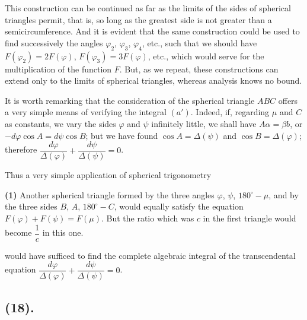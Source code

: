 \documentclass{article}
\begin{document}
This construction can be continued as far as the limits of the sides of spherical triangles permit, that is, so long as the greatest side is not greater than a semicircumference. And it is evident that the same construction could be used to find successively the angles $\varphi_{2}$, $\varphi_{3}$, $\varphi_{4}$, etc., such that we should have $F(\varphi_{2})=2F(\varphi)$, $F(\varphi_{3})=3F(\varphi)$, etc., which would serve for the multiplication of the function $F$. But, as we repeat, these constructions can extend only to the limits of spherical triangles, whereas analysis knows no bound.

It is worth remarking that the consideration of the spherical triangle $ABC$ offers a very simple means of verifying the integral $(a')$. Indeed, if, regarding $\mu$ and $C$ as constants, we vary the sides $\varphi$ and $\psi$ infinitely little, we shall have $A\alpha=\beta b$, or $-d\varphi\cos A=d\psi\cos B$; but we have found $\cos A=\Delta(\psi)$ and $\cos B=\Delta(\varphi)$; therefore $\dfrac{d\varphi}{\Delta(\varphi)}+\dfrac{d\psi}{\Delta(\psi)}=0$.

Thus a very simple application of spherical trigonometry

\textbf{(1)} Another spherical triangle formed by the three angles $\varphi$, $\psi$, $180^{\circ}-\mu$, and by the three sides $B$, $A$, $180^{\circ}-C$, would equally satisfy the equation $F(\varphi)+F(\psi)=F(\mu)$. But the ratio which was $c$ in the first triangle would become $\dfrac{1}{c}$ in this one.

would have sufficed to find the complete algebraic integral of the transcendental equation $\dfrac{d\varphi}{\Delta(\varphi)}+\dfrac{d\psi}{\Delta(\psi)}=0$.

\subsection*{(18).}
\end{document}
